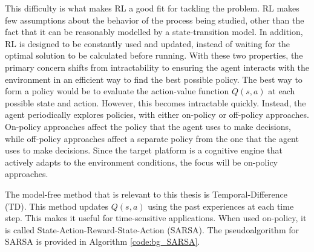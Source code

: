 	\par This difficulty is what makes RL a good fit for tackling the problem. RL makes few assumptions about the behavior of the process being studied, other than the fact that it can be reasonably modelled by a state-transition model. In addition, RL is designed to be constantly used and updated, instead of waiting for the optimal solution to be calculated before running. With these two properties, the primary concern shifts from intractability to ensuring the agent interacts with the environment in an efficient way to find the best possible policy. The best way to form a policy would be to evaluate the action-value function $Q(s,a)$ at each possible state and action. However, this becomes intractable quickly. Instead, the agent periodically explores policies, with either on-policy or off-policy approaches. On-policy approaches affect the policy that the agent uses to make decisions, while off-policy approaches affect a separate policy from the one that the agent uses to make decisions. Since the target platform is a cognitive engine that actively adapts to the environment conditions, the focus will be on-policy approaches. 
	\par The model-free method that is relevant to this thesis is Temporal-Difference (TD). This method updates $Q(s,a)$ using the past experiences at each time step. This makes it useful for time-sensitive applications. When used on-policy, it is called State-Action-Reward-State-Action (SARSA). The pseudoalgorithm for SARSA is provided in Algorithm \ref{code:bg_SARSA}.
	
